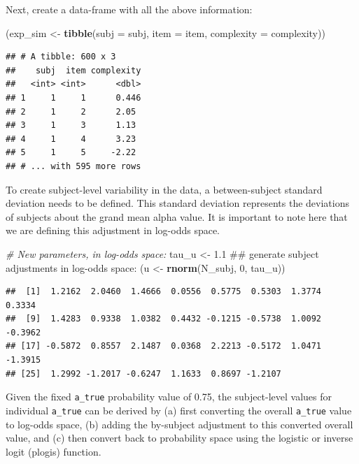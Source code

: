 \documentclass[12pt,]{krantz}
\newenvironment{Shaded}{\begin{snugshade}}{\end{snugshade}}
\newcommand{\KeywordTok}[1]{\textcolor[rgb]{0.13,0.29,0.53}{\textbf{#1}}}
\newcommand{\DataTypeTok}[1]{\textcolor[rgb]{0.13,0.29,0.53}{#1}}
\newcommand{\DecValTok}[1]{\textcolor[rgb]{0.00,0.00,0.81}{#1}}
\newcommand{\FloatTok}[1]{\textcolor[rgb]{0.00,0.00,0.81}{#1}}
\newcommand{\StringTok}[1]{\textcolor[rgb]{0.31,0.60,0.02}{#1}}
\newcommand{\CommentTok}[1]{\textcolor[rgb]{0.56,0.35,0.01}{\textit{#1}}}
\newcommand{\NormalTok}[1]{#1}
\theoremstyle{definition}
\theoremstyle{definition}
\theoremstyle{definition}
\theoremstyle{remark}
\begin{document}
Next, create a data-frame with all the above information:

\begin{Shaded}
\begin{Highlighting}[]
\NormalTok{(exp_sim <-}\StringTok{ }\KeywordTok{tibble}\NormalTok{(}\DataTypeTok{subj =}\NormalTok{ subj,}
                  \DataTypeTok{item =}\NormalTok{ item,}
                  \DataTypeTok{complexity =}\NormalTok{ complexity))}
\end{Highlighting}
\end{Shaded}

\begin{verbatim}
## # A tibble: 600 x 3
##    subj  item complexity
##   <int> <int>      <dbl>
## 1     1     1      0.446
## 2     1     2      2.05 
## 3     1     3      1.13 
## 4     1     4      3.23 
## 5     1     5     -2.22 
## # ... with 595 more rows
\end{verbatim}

To create subject-level variability in the data, a between-subject
standard deviation needs to be defined. This standard deviation
represents the deviations of subjects about the grand mean alpha value.
It is important to note here that we are defining this adjustment in
log-odds space.

\begin{Shaded}
\begin{Highlighting}[]
\CommentTok{# New parameters, in log-odds space:}
\NormalTok{tau_u <-}\StringTok{ }\FloatTok{1.1}
\NormalTok{## generate subject adjustments in log-odds space:}
\NormalTok{(u <-}\StringTok{ }\KeywordTok{rnorm}\NormalTok{(N_subj, }\DecValTok{0}\NormalTok{, tau_u))}
\end{Highlighting}
\end{Shaded}

\begin{verbatim}
##  [1]  1.2162  2.0460  1.4666  0.0556  0.5775  0.5303  1.3774  0.3334
##  [9]  1.4283  0.9338  1.0382  0.4432 -0.1215 -0.5738  1.0092 -0.3962
## [17] -0.5872  0.8557  2.1487  0.0368  2.2213 -0.5172  1.0471 -1.3915
## [25]  1.2992 -1.2017 -0.6247  1.1633  0.8697 -1.2107
\end{verbatim}

Given the fixed \texttt{a\_true} probability value of 0.75, the
subject-level values for individual \texttt{a\_true} can be derived by
(a) first converting the overall \texttt{a\_true} value to log-odds
space, (b) adding the by-subject adjustment to this converted overall
value, and (c) then convert back to probability space using the logistic
or inverse logit (plogis) function.
\end{document}
